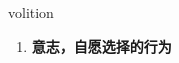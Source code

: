 
\begin{frame}
{\huge volition}
\begin{center}
\begin{enumerate}\Large
  \item \textbf{意志，自愿选择的行为}
\end{enumerate}
\end{center}
\end{frame}
